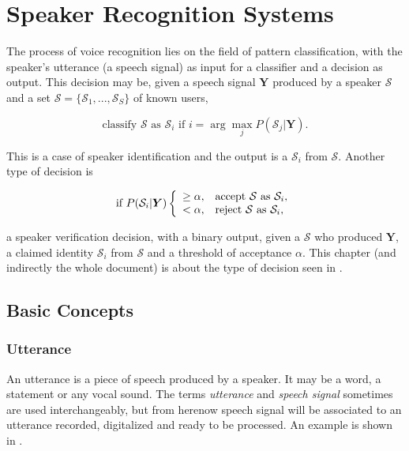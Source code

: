 \chapter{Speaker Recognition Systems}
\label{ch:speaker-recognition-system}

The process of voice recognition lies on the field of pattern classification, with the speaker's utterance (a speech signal) as input for a classifier and a decision as output. This decision may be, given a speech signal $\boldsymbol{Y}$ produced by a speaker $\mathcal{S}$ and a set $\boldsymbol{\mathcal{S}} = \{\mathcal{S}_1, ..., \mathcal{S}_S\}$ of known users,

\begin{equation}
    \text{classify } \mathcal{S} \text{ as } \mathcal{S}_i \text{ if } i = \arg\max_j P(\mathcal{S}_j|\boldsymbol{Y}).
    \label{eq:decision_speaker_identification}
\end{equation}

\noindent This is a case of speaker identification and the output is a $\mathcal{S}_i$ from $\boldsymbol{\mathcal{S}}$. Another type of decision is

\begin{equation}
    \text{if } P(\mathcal{S}_i|\boldsymbol{Y}) \verifytestB{\alpha}{\mathcal{S} \text{ as } \mathcal{S}_i}
    \label{eq:decision_speaker_verification}
\end{equation}

\noindent a speaker verification decision, with a binary output, given a $\mathcal{S}$ who produced $\boldsymbol{Y}$, a claimed identity $\mathcal{S}_i$ from $\boldsymbol{\mathcal{S}}$ and a threshold of acceptance $\alpha$. This chapter (and indirectly the whole document) is about the type of decision seen in .

\section{Basic Concepts}

\subsection{Utterance}

An utterance is a piece of speech produced by a speaker. It may be a word, a statement or any vocal sound. The terms \emph{utterance} and \emph{speech signal} sometimes are used interchangeably, but from herenow speech signal will be associated to an utterance recorded, digitalized and ready to be processed. An example is shown in .


